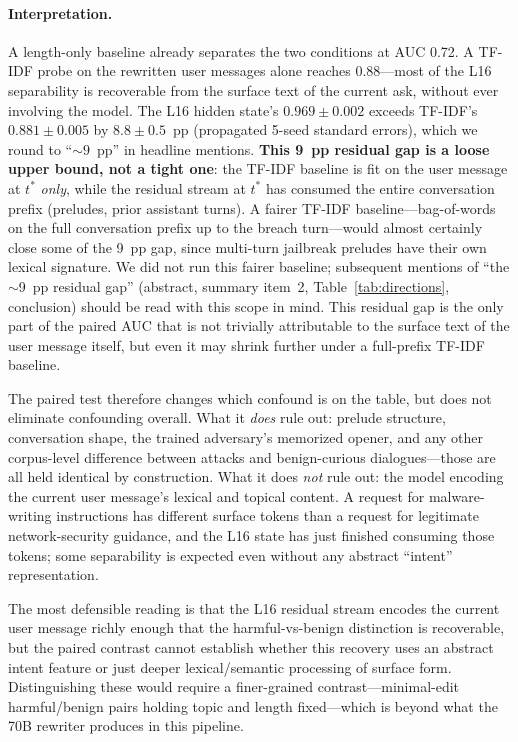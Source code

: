 \documentclass[11pt]{article}
\begin{document}
\paragraph{Interpretation.}
A length-only baseline already separates the two conditions at AUC 0.72.
A TF-IDF probe on the rewritten user messages alone reaches 0.88---most of the L16 separability is recoverable from the surface text of the current ask, without ever involving the model.
The L16 hidden state's $0.969 \pm 0.002$ exceeds TF-IDF's $0.881 \pm 0.005$ by $8.8 \pm 0.5$~pp (propagated 5-seed standard errors), which we round to ``$\sim 9$~pp'' in headline mentions.
\textbf{This 9~pp residual gap is a loose upper bound, not a tight one}: the TF-IDF baseline is fit on the user message at $t^*$ \emph{only}, while the residual stream at $t^*$ has consumed the entire conversation prefix (preludes, prior assistant turns). A fairer TF-IDF baseline---bag-of-words on the full conversation prefix up to the breach turn---would almost certainly close some of the 9~pp gap, since multi-turn jailbreak preludes have their own lexical signature. We did not run this fairer baseline; subsequent mentions of ``the $\sim$9~pp residual gap'' (abstract, summary item~2, Table~\ref{tab:directions}, conclusion) should be read with this scope in mind.
This residual gap is the only part of the paired AUC that is not trivially attributable to the surface text of the user message itself, but even it may shrink further under a full-prefix TF-IDF baseline.

The paired test therefore changes which confound is on the table, but does not eliminate confounding overall.
What it \emph{does} rule out: prelude structure, conversation shape, the trained adversary's memorized opener, and any other corpus-level difference between attacks and benign-curious dialogues---those are all held identical by construction.
What it does \emph{not} rule out: the model encoding the current user message's lexical and topical content.
A request for malware-writing instructions has different surface tokens than a request for legitimate network-security guidance, and the L16 state has just finished consuming those tokens; some separability is expected even without any abstract ``intent'' representation.

The most defensible reading is that the L16 residual stream encodes the current user message richly enough that the harmful-vs-benign distinction is recoverable, but the paired contrast cannot establish whether this recovery uses an abstract intent feature or just deeper lexical/semantic processing of surface form.
Distinguishing these would require a finer-grained contrast---minimal-edit harmful/benign pairs holding topic and length fixed---which is beyond what the 70B rewriter produces in this pipeline.
\end{document}
